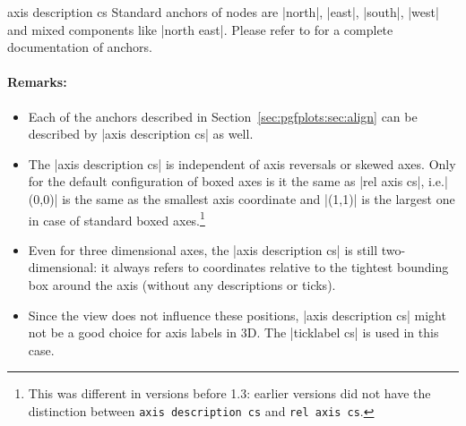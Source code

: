 \begin{coordinatesystem}{axis description cs}
    Standard anchors of nodes are |north|, |east|, |south|, |west| and mixed
    components like |north east|. Please refer to \cite{tikz} for a complete
    documentation of anchors.


    \paragraph{Remarks:}

    \begin{itemize}
        \item Each of the anchors described in
            Section~\ref{sec:pgfplots:sec:align} can be described by
            |axis description cs| as well.
        \item The |axis description cs| is independent of axis reversals or
            skewed axes. Only for the default configuration of boxed axes is
            it the same as |rel axis cs|, i.e.\@ |(0,0)| is the same as the
            smallest axis coordinate and |(1,1)| is the largest one in case
            of standard boxed axes.\footnote{This was different in versions
            before 1.3: earlier versions did not have the distinction between
            \texttt{axis description cs} and \texttt{rel axis cs}.}
        \item Even for three dimensional axes, the |axis description cs| is
            still two-dimensional: it always refers to coordinates relative
            to the tightest bounding box around the axis (without any
            descriptions or ticks).
\begin{codeexample}[width=4cm]
\end{codeexample}
        \item Since the view does not influence these positions,
        |axis description cs| might not be a good choice for axis labels in 3D.
        The |ticklabel cs| is used in this case.
    \end{itemize}
\end{coordinatesystem}

